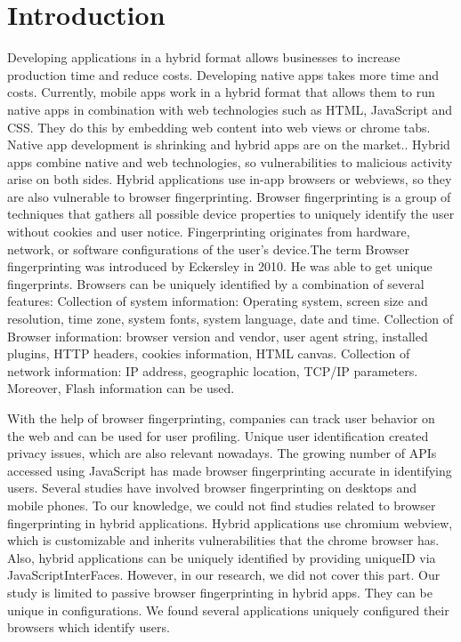 \section{Introduction}


      Developing applications in a hybrid format allows businesses to increase production time and reduce costs. Developing 
native apps takes more time and costs. Currently, mobile apps work in a hybrid format that allows them to run native apps in combination with web technologies such as HTML, JavaScript and CSS. They do this by embedding web content into web views or chrome tabs\cite{webview}. Native app development is shrinking and hybrid apps are on the market.\cite{LuDroid-Journal}. Hybrid apps combine native and web technologies, so vulnerabilities to malicious activity arise on both sides\cite{LuDroid-Journal}. 
Hybrid applications use in-app browsers or webviews, so they are also vulnerable to browser fingerprinting.
Browser fingerprinting is a group of techniques that gathers all possible device properties to uniquely identify the user without cookies and user notice. Fingerprinting originates from hardware, network, or software configurations of the user's device.The term Browser fingerprinting was introduced by Eckersley\cite{eckersley2010unique} in 2010. He was able to get unique fingerprints. Browsers can be uniquely identified by a combination of several features:
Collection of system information: Operating system, screen size and resolution, time zone, system fonts, system language, date and time.
Collection of Browser information: browser version and vendor, user agent string, installed plugins, HTTP headers, cookies information, HTML canvas.
Collection of network information: IP address, geographic location, TCP/IP parameters. 
Moreover, Flash information can be used. 

With the help of browser fingerprinting, companies can track user behavior on the web\cite{nikiforakis2013cookieless}  and can be used for user profiling. 
Unique user identification created privacy issues, which are also relevant nowadays. 
The growing number of APIs accessed using JavaScript has made browser fingerprinting accurate in identifying users. Several studies have involved browser fingerprinting on desktops\cite{laperdrix2020browser} and mobile phones\cite{gomez2017fingerprinting}\cite{kurtz2016fingerprinting}\cite{oliver2018fingerprinting}. To our knowledge, we could not find studies related to browser fingerprinting in hybrid applications.
Hybrid applications use chromium webview, which is customizable and inherits vulnerabilities that the chrome browser has. Also, hybrid applications can be uniquely identified by providing uniqueID via JavaScriptInterFaces. However, in our research, we did not cover this part. 
Our study is limited to passive browser fingerprinting in hybrid apps. They can be unique in configurations. We found several applications uniquely configured their browsers which identify users. 
